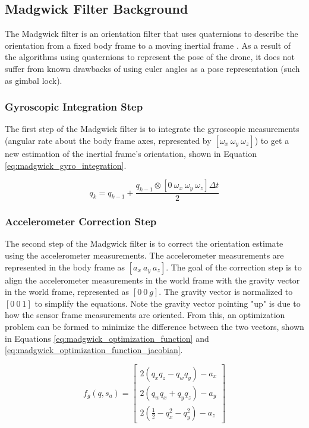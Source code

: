 \documentclass[bare_jrnl_transmag]{subfiles}
\begin{document}
\subsection{Madgwick Filter Background}
The Madgwick filter is an orientation filter that uses quaternions to describe the orientation from a fixed body frame to a moving inertial frame \cite{ahrs_madgwick}. As a result of the algorithms using quaternions to represent the pose of the drone, it does not suffer from known drawbacks of using euler angles as a pose representation (such as gimbal lock).

\subsubsection{Gyroscopic Integration Step}
The first step of the Madgwick filter is to integrate the gyroscopic measurements (angular rate about the body frame axes, represented by $[\omega_x \ \omega_y \ \omega_z]$) to get a new estimation of the inertial frame's orientation, shown in Equation \ref{eq:madgwick_gyro_integration}.

\begin{equation}
    q_{k} = q_{k-1} + \frac{q_{k-1} \otimes [0 \ \omega_x \ \omega_y \ \omega_z] \Delta t}{2}
    \label{eq:madgwick_gyro_integration}
\end{equation}

\subsubsection{Accelerometer Correction Step}
The second step of the Madgwick filter is to correct the orientation estimate using the accelerometer measurements. The accelerometer measurements are represented in the body frame as $[a_x \ a_y \ a_z]$. The goal of the correction step is to align the accelerometer measurements in the world frame with the gravity vector in the world frame, represented as $[0 \ 0 \ g]$. The gravity vector is normalized to $[0 \ 0 \ 1]$ to simplify the equations. Note the gravity vector pointing "up" is due to how the sensor frame measurements are oriented. From this, an optimization problem can be formed to minimize the difference between the two vectors, shown in Equations \ref{eq:madgwick_optimization_function} and \ref{eq:madgwick_optimization_function_jacobian}.

\begin{equation}
f_g(q, s_a) =
\begin{bmatrix}
    2(q_x q_z - q_w q_y) - a_x \\
    2(q_w q_x + q_y q_z) - a_y \\
    2\left(\frac{1}{2} - q_x^2 - q_y^2\right) - a_z
    \end{bmatrix}
    \label{eq:madgwick_optimization_function}
\end{equation}
    
\end{document}
